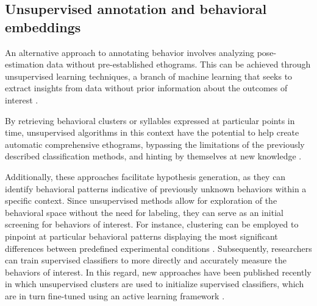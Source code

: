 \subsection{Unsupervised annotation and behavioral embeddings}

An alternative approach to annotating behavior involves analyzing pose-estimation data without pre-established ethograms. This can be achieved through unsupervised learning techniques, a branch of machine learning that seeks to extract insights from data without prior information about the outcomes of interest \cite{ChristopherMBishop2006PatternLearning}. 

By retrieving behavioral clusters or syllables expressed at particular points in time, unsupervised algorithms in this context have the potential to help create automatic comprehensive ethograms, bypassing the limitations of the previously described classification methods, and hinting by themselves at new knowledge \cite{Weinreb2023Keypoint-MoSeq:Dynamics}.

Additionally, these approaches facilitate hypothesis generation, as they can identify behavioral patterns indicative of previously unknown behaviors within a specific context. Since unsupervised methods allow for exploration of the behavioral space without the need for labeling, they can serve as an initial screening for behaviors of interest. For instance, clustering can be employed to pinpoint at particular behavioral patterns displaying the most significant differences between predefined experimental conditions \cite{Bordes2023AutomaticallyStress}. Subsequently, researchers can train supervised classifiers to more directly and accurately measure the behaviors of interest. In this regard, new approaches have been published recently in which unsupervised clusters are used to initialize supervised classifiers, which are in turn fine-tuned using an active learning framework \cite{Schweihoff2022A-SOiDBehavior}.

